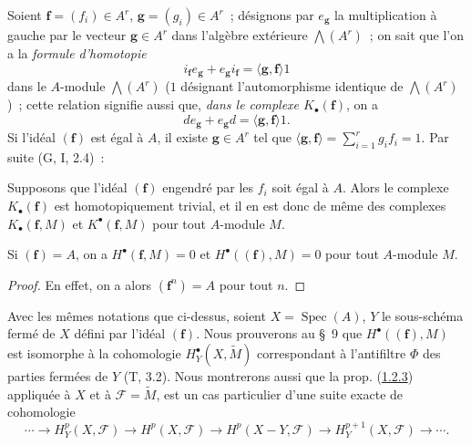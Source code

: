 \begin{env}[1.1.7]
\label{III.1.1.7-fr}
Soient $\mathbf f=(f_i)\in A^r$, $\mathbf g=(g_i)\in A^r$~; désignons par
$e_{\mathbf g}$ la multiplication à gauche par le vecteur
$\mathbf g\in A^r$ dans l'algèbre extérieure $\bigwedge(A^r)$~; on sait que
l'on a la \emph{formule d'homotopie}
\begin{equation}
\label{III.1.1.7.1-fr}
\tag{1.1.7.1}
i_{\mathbf f}e_{\mathbf g}+e_{\mathbf g}i_{\mathbf f}
=\langle\mathbf g,\mathbf f\rangle 1
\end{equation}
dans le $A$-module $\bigwedge(A^r)$ ($1$ désignant l'automorphisme identique de
$\bigwedge(A^r)$)~;
cette relation signifie aussi que, \emph{dans le complexe
$K_\bullet(\mathbf f)$}, on a
\begin{equation}
\label{III.1.1.7.2-fr}
\tag{1.1.7.2}
de_{\mathbf g}+e_{\mathbf g}d=\langle\mathbf g,\mathbf f\rangle 1.
\end{equation}
Si l'idéal $(\mathbf f)$ est égal à $A$, il existe $\mathbf g\in A^r$ tel que
$\langle\mathbf g,\mathbf f\rangle=\sum_{i=1}^r g_if_i=1$. Par suite
(G, I, 2.4)~:
\end{env}

\begin{proposition}[1.1.8]
\label{III.1.1.8-fr}
Supposons que l'idéal $(\mathbf f)$ engendré par les $f_i$ soit égal à $A$.
Alors le complexe $K_\bullet(\mathbf f)$ est homotopiquement trivial, et il en
est donc de même des complexes $K_\bullet(\mathbf f,M)$ et
$K^\bullet(\mathbf f,M)$ pour tout $A$-module $M$.
\end{proposition}

\begin{corollary}[1.1.9]
\label{III.1.1.9-fr}
Si $(\mathbf f)=A$, on a $H^\bullet(\mathbf f,M)=0$ et
$H^\bullet((\mathbf f),M)=0$ pour tout $A$-module $M$.
\end{corollary}

\begin{proof}
En effet, on a alors $(\mathbf f^n)=A$ pour tout $n$.
\end{proof}

\begin{remark}[1.1.10]
\label{III.1.1.10-fr}
Avec les mêmes notations que ci-dessus, soient $X=\operatorname{Spec}(A)$,
$Y$ le sous-schéma fermé de $X$ défini par l'idéal $(\mathbf f)$. Nous
prouverons au \S~9 que $H^\bullet((\mathbf f),M)$ est isomorphe à la
cohomologie $H_Y^\bullet(X,\widetilde M)$ correspondant à l'antifiltre $\Phi$
des parties fermées de $Y$ (T, 3.2). Nous montrerons aussi que la prop.
(\hyperref[III.1.2.3-fr]{1.2.3}) appliquée à $X$ et à
$\mathcal F=\widetilde M$, est un cas particulier d'une suite exacte de
cohomologie
\[
\cdots\longrightarrow H_Y^p(X,\mathcal F)\longrightarrow H^p(X,\mathcal F)
\longrightarrow H^p(X-Y,\mathcal F)\longrightarrow H_Y^{p+1}(X,\mathcal F)
\longrightarrow\cdots.
\]
\end{remark}

